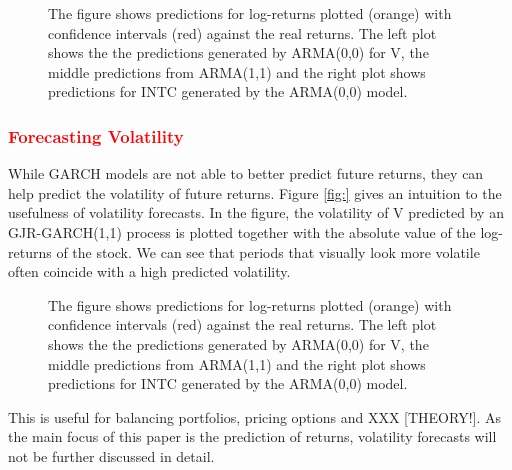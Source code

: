 \begin{figure}[h]
    \centering
    \begin{adjustbox}{width = 0.95\textwidth}
    
    
    
    \end{adjustbox}
    \caption{The figure shows predictions for log-returns plotted (orange) with confidence intervals (red) against the real returns. The left plot shows the the predictions generated by ARMA(0,0) for V, the middle predictions from ARMA(1,1) and the right plot shows predictions for INTC generated by the ARMA(0,0) model.}
    \label{fig:V_INTC_ARMA_predictions_plot}
\end{figure}{}

\subsubsection{\textcolor{red}{Forecasting Volatility}}
While GARCH models are not able to better predict future returns, they can help predict the volatility of future returns. Figure \ref{fig:} gives an intuition to the usefulness of volatility forecasts. In the figure, the volatility of V predicted by an GJR-GARCH(1,1) process is plotted together with the absolute value of the log-returns of the stock. We can see that periods that visually look more volatile often coincide with a high predicted volatility. 

\begin{figure}[h]
    \centering
    \begin{adjustbox}{width = 0.95\textwidth}
    
    
    \end{adjustbox}
    \caption{The figure shows predictions for log-returns plotted (orange) with confidence intervals (red) against the real returns. The left plot shows the the predictions generated by ARMA(0,0) for V, the middle predictions from ARMA(1,1) and the right plot shows predictions for INTC generated by the ARMA(0,0) model.}
    \label{fig:V_INTC_ARMA_predictions_plot}
\end{figure}{}


This is useful for balancing portfolios, pricing options and XXX [THEORY!]. As the main focus of this paper is the prediction of returns, volatility forecasts will not be further discussed in detail. 

